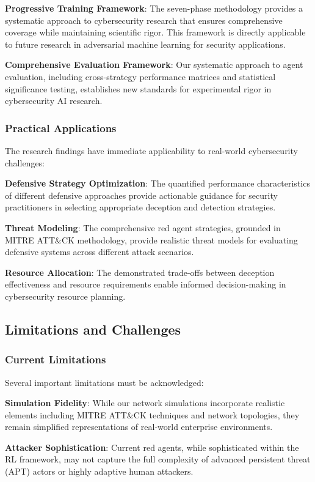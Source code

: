\documentclass[11pt]{article}
\newcounter{phase}[algorithm]
\theoremstyle{definition}
\theoremstyle{plain}
\begin{document}
\textbf{Progressive Training Framework}: The seven-phase methodology provides a systematic approach to cybersecurity research that ensures comprehensive coverage while maintaining scientific rigor. This framework is directly applicable to future research in adversarial machine learning for security applications.

\textbf{Comprehensive Evaluation Framework}: Our systematic approach to agent evaluation, including cross-strategy performance matrices and statistical significance testing, establishes new standards for experimental rigor in cybersecurity AI research.

\subsubsection{Practical Applications}
The research findings have immediate applicability to real-world cybersecurity challenges:

\textbf{Defensive Strategy Optimization}: The quantified performance characteristics of different defensive approaches provide actionable guidance for security practitioners in selecting appropriate deception and detection strategies.

\textbf{Threat Modeling}: The comprehensive red agent strategies, grounded in MITRE ATT\&CK methodology, provide realistic threat models for evaluating defensive systems across different attack scenarios.

\textbf{Resource Allocation}: The demonstrated trade-offs between deception effectiveness and resource requirements enable informed decision-making in cybersecurity resource planning.

\subsection{Limitations and Challenges}

\subsubsection{Current Limitations}
Several important limitations must be acknowledged:

\textbf{Simulation Fidelity}: While our network simulations incorporate realistic elements including MITRE ATT\&CK techniques and network topologies, they remain simplified representations of real-world enterprise environments.

\textbf{Attacker Sophistication}: Current red agents, while sophisticated within the RL framework, may not capture the full complexity of advanced persistent threat (APT) actors or highly adaptive human attackers.
\end{document}
